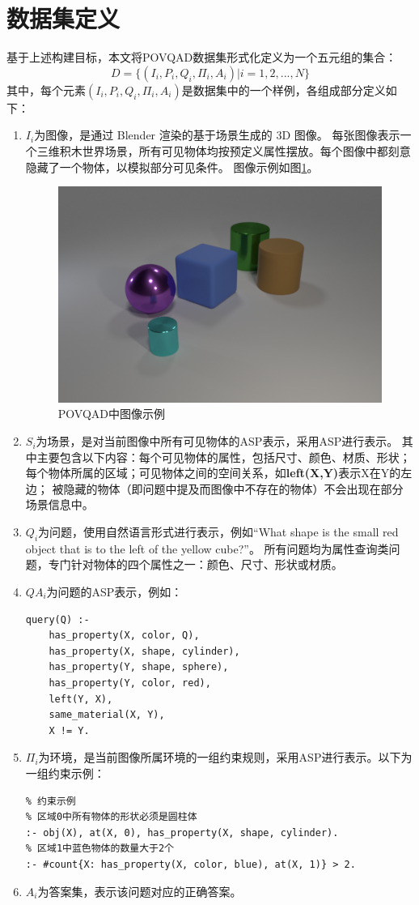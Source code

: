 \section{数据集定义}
基于上述构建目标，本文将POVQAD数据集形式化定义为一个五元组的集合：
$$D = \{ (I_i,P_i,Q_i,\Pi_i ,A_i) | i=1,2,...,N \}$$
其中，每个元素$(I_i,P_i,Q_i,\Pi_i ,A_i)$是数据集中的一个样例，各组成部分定义如下：
\begin{enumerate}[nosep]
\item \textbf{$I_i$}为图像，是通过 Blender 渲染的基于场景生成的 3D 图像。
每张图像表示一个三维积木世界场景，所有可见物体均按预定义属性摆放。每个图像中都刻意隐藏了一个物体，以模拟部分可见条件。
图像示例如图\ref{POVQAD-figure}。
\begin{figure}
\centering
\includegraphics[scale=0.6]{figures/POVQAD中图像示例.png}
\caption{POVQAD中图像示例}
\label{POVQAD-figure}
\end{figure}
\item \textbf{$S_i$}为场景，是对当前图像中所有可见物体的ASP表示，采用ASP进行表示。
其中主要包含以下内容：每个可见物体的属性，包括尺寸、颜色、材质、形状；每个物体所属的区域；可见物体之间的空间关系，如\textbf{left(X,Y)}表示X在Y的左边；
被隐藏的物体（即问题中提及而图像中不存在的物体）不会出现在部分场景信息中。
\item \textbf{$Q_i$}为问题，使用自然语言形式进行表示，例如“What shape is the small red object that is to the left of the yellow cube?”。
所有问题均为属性查询类问题，专门针对物体的四个属性之一：颜色、尺寸、形状或材质。
\item \textbf{$QA_i$}为问题的ASP表示，例如：
\begin{lstlisting}
query(Q) :-
    has_property(X, color, Q),
    has_property(X, shape, cylinder),
    has_property(Y, shape, sphere),
    has_property(Y, color, red),
    left(Y, X),
    same_material(X, Y),
    X != Y.
\end{lstlisting}
\item \textbf{$\Pi_i$}为环境，是当前图像所属环境的一组约束规则，采用ASP进行表示。以下为一组约束示例：
\begin{lstlisting}
% 约束示例
% 区域0中所有物体的形状必须是圆柱体
:- obj(X), at(X, 0), has_property(X, shape, cylinder).
% 区域1中蓝色物体的数量大于2个
:- #count{X: has_property(X, color, blue), at(X, 1)} > 2.
\end{lstlisting}
\item \textbf{$A_i$}为答案集，表示该问题对应的正确答案。
\end{enumerate}
